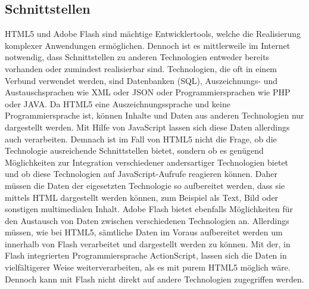 \subsection{Schnittstellen}
HTML5 und Adobe Flash sind mächtige Entwicklertools, welche die Realisierung
komplexer Anwendungen ermöglichen. Dennoch ist es mittlerweile im Internet
notwendig, dass Schnittstellen zu anderen Technologien entweder bereits
vorhanden oder zumindest realisierbar sind. Technologien, die oft in einem
Verbund verwendet werden, sind Datenbanken (SQL), Auszeichnungs- und
Austauschsprachen wie XML oder JSON oder Programmiersprachen wie PHP oder
JAVA.
\newline\newline
Da HTML5 eine Auszeichnungssprache und keine Programmiersprache ist, können
Inhalte und Daten aus anderen Technologien nur dargestellt werden. Mit
Hilfe von JavaScript lassen sich diese Daten allerdings auch verarbeiten.
Demnach ist im Fall von HTML5 nicht die Frage, ob die Technologie ausreichende
Schnittstellen bietet, sondern ob es genügend Möglichkeiten zur Integration
verschiedener andersartiger Technologien bietet und ob diese Technologien
auf JavaScript-Aufrufe reagieren können. Daher müssen die Daten der
eigesetzten Technologie so aufbereitet werden, dass sie mittels HTML
dargestellt werden können, zum Beispiel als Text, Bild oder sonstigen
multimedialen Inhalt.
\newline\newline
Adobe Flash bietet ebenfalls Möglichkeiten für den Austausch von Daten
zwischen verschiedenen Technologien an. Allerdings müssen, wie bei HTML5,
sämtliche Daten im Voraus aufbereitet werden um innerhalb von Flash
verarbeitet und dargestellt werden zu können. Mit der, in Flash integrierten
Programmiersprache ActionScript, lassen sich die Daten in vielfältigerer
Weise weiterverarbeiten, als es mit purem HTML5 möglich wäre. Dennoch kann
mit Flash nicht direkt auf andere Technologien zugegriffen werden.

